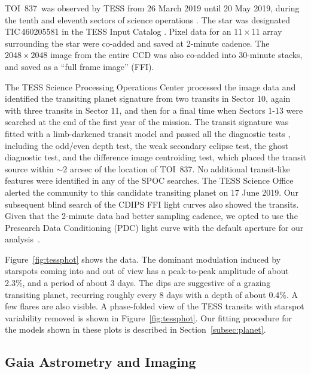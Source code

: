 \documentclass[12pt,twocolumn,tighten]{aastex63}
\newcommand{\tn}{TOI~837} %
\begin{document}
\tn\ was observed by TESS from 26 March 2019 until 20 May 2019, during
the tenth and eleventh sectors of science operations
\citep{ricker_transiting_2015}.  The star was designated
TIC\,460205581 in the TESS Input Catalog
\citep{stassun_TIC_2018,stassun_TIC8_2019}.  Pixel data for an
$11\times11$ array surrounding the star were co-added and saved at
2-minute cadence.  The $2048\times2048$ image from the entire CCD was
also co-added into 30-minute stacks, and saved as a ``full frame
image'' (FFI).

The TESS Science Processing Operations Center
\citep{jenkins_tess_2016} processed the image data and identified the
transiting planet signature from two transits in
Sector 10, again with three transits in Sector 11, and then for a
final time when Sectors 1-13 were searched at the end of the first
year of the mission. The transit signature was fitted with a
limb-darkened transit model \citep{li_kepler_2019} and passed all the
diagnostic tests \citep{twicken_kepler_2018}, including the odd/even
depth test, the weak secondary eclipse test, the ghost diagnostic
test, and the difference image centroiding test, which placed the
transit source within $\sim$2 arcsec of the location of TOI~837. No
additional transit-like features were identified in any of the SPOC
searches. The TESS Science Office alerted the community to this
candidate transiting planet on 17 June 2019.  Our subsequent blind
search of the CDIPS FFI light curves also showed the transits. Given
that the 2-minute data had better sampling cadence, we opted to use
the Presearch Data Conditioning (PDC) light curve with the default
aperture for our
analysis~\citep{smith_kepler_2012,stumpe_multiscale_2014,smith_finding_2016}.

Figure~\ref{fig:tessphot} shows the data.  The dominant modulation
induced by starspots coming into and out of view has a peak-to-peak
amplitude of about 2.3\%, and a period of about 3 days.  The dips are
suggestive of a grazing transiting planet, recurring roughly every 8
days with a depth of about 0.4\%.  A few flares are also visible.  A
phase-folded view of the TESS transits with starspot variability
removed is shown in Figure~\ref{fig:tessphot}. Our fitting procedure
for the models shown in these plots is described in
Section~\ref{subsec:planet}.


\subsection{Gaia Astrometry and Imaging}
\label{subsec:gaia}
\end{document}
